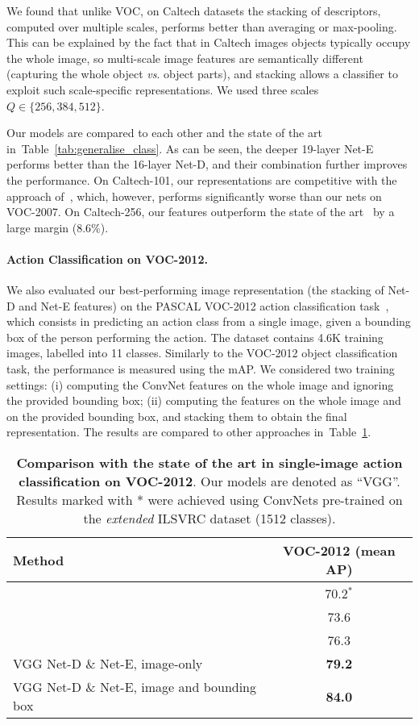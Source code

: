 \documentclass{article} %
\makeatletter
\newcommand{\tblref}[1]{Table~\ref{#1}}
\newcommand*{\vs}{\emph{vs}.\@\xspace}
\makeatother
\begin{document}
We found that unlike VOC, on Caltech datasets the stacking of descriptors, computed over multiple scales, performs better than averaging or max-pooling. 
This can be explained by the fact that in Caltech images objects typically occupy the whole image, so multi-scale image features are semantically different (capturing the whole object \vs object parts), and stacking allows a classifier to exploit such scale-specific representations. We used three scales $Q \in \{256,384,512\}$.

Our models are compared to each other and the state of the art in~\tblref{tab:generalise_class}. 
As can be seen, the deeper 19-layer Net-E performs better than the 16-layer Net-D, and their combination further improves the performance.
On Caltech-101, our representations are competitive with the approach of~\citet{He14}, which, however, performs significantly worse than our nets on VOC-2007. On Caltech-256, our features outperform the state of the art~\citep{Chatfield14} by a large margin ($8.6\%$). 

\paragraph{Action Classification on VOC-2012.}
We also evaluated our best-performing image representation (the stacking of Net-D and Net-E features) on the PASCAL VOC-2012 action classification task~\citep{Everingham15}, which consists in predicting an action class from a single image, given a bounding box of the person performing the action. The dataset contains 4.6K training images, labelled into 11 classes. Similarly to the VOC-2012 object classification task, the performance is measured using the mAP. We considered two training settings: 
(i) computing the ConvNet features on the whole image and ignoring the provided bounding box;
(ii) computing the features on the whole image and on the provided bounding box, and stacking them to obtain the final representation.
The results are compared to other approaches in~\tblref{tab:generalise_action}.
\begin{table}[htb]
\setlength{\tabcolsep}{2pt}
\small
\centering
\caption{\textbf{Comparison with the state of the art in single-image action classification on VOC-2012}.
Our models are denoted as ``VGG''. 
Results marked with * were achieved using \mbox{ConvNets} pre-trained on the \emph{extended} ILSVRC dataset (1512 classes).
}
\begin{tabular}{|l|c|} \hline
Method & VOC-2012 (mean AP) \\ \hline
\citep{Oquab14} & 70.2$^*$ \\ \hline
\citep{Gkioxari14} & 73.6 \\ \hline
\citep{Hoai14a} & 76.3 \\ \hline\hline
VGG Net-D \& Net-E, image-only & \textbf{79.2} \\ \hline
VGG Net-D \& Net-E, image and bounding box & \textbf{84.0} \\ \hline
\end{tabular}
\label{tab:generalise_action}
\end{table}
\end{document}

